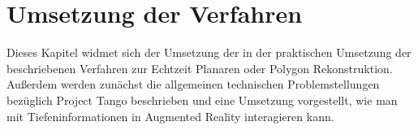 \chapter{Umsetzung der Verfahren}

Dieses Kapitel widmet sich der Umsetzung der in der praktischen Umsetzung der beschriebenen Verfahren zur Echtzeit Planaren oder Polygon Rekonstruktion. Außerdem werden zunächst die allgemeinen technischen Problemstellungen bezüglich Project Tango beschrieben und eine Umsetzung vorgestellt, wie man mit Tiefeninformationen in Augmented Reality interagieren kann.









